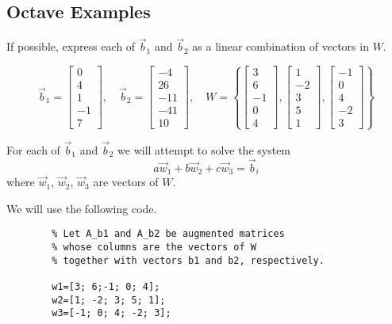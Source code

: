 \documentclass{ximera}
\begin{document}
\subsection*{Octave Examples}
\begin{example}\label{ex__oct_span}
    If possible, express each of $\vec{b}_1$ and $\vec{b}_2$ as a linear combination of vectors in $W$.  

    $$\vec{b}_1=\begin{bmatrix}0\\4\\1\\-1\\7\end{bmatrix},\quad \vec{b}_2=\begin{bmatrix}-4\\26\\-11\\-41\\10\end{bmatrix},\quad W=\left\{\begin{bmatrix}3\\6\\-1\\0\\4\end{bmatrix},\begin{bmatrix}1\\-2\\3\\5\\1\end{bmatrix}, \begin{bmatrix}-1\\0\\4\\-2\\3\end{bmatrix}\right\}$$

    \begin{explanation}
        For each of $\vec{b}_1$ and $\vec{b}_2$ we will attempt to solve the system $$a\vec{w}_1+b\vec{w}_2+c\vec{w}_3=\vec{b}_i$$
        where $\vec{w}_1$, $\vec{w}_2$, $\vec{w}_3$ are vectors of $W$.

    We will use the following code. 
    \begin{verbatim}
        % Let A_b1 and A_b2 be augmented matrices 
        % whose columns are the vectors of W
        % together with vectors b1 and b2, respectively.

        w1=[3; 6;-1; 0; 4];
        w2=[1; -2; 3; 5; 1];
        w3=[-1; 0; 4; -2; 3];


\end{verbatim}
\end{explanation}
\end{example}
\end{document}
